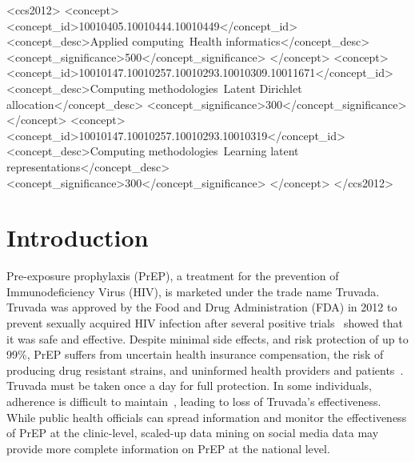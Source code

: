 \documentclass{sig-alternate-05-2015}
\begin{document}
%
%

\begin{CCSXML}
<ccs2012>
<concept>
<concept_id>10010405.10010444.10010449</concept_id>
<concept_desc>Applied computing~Health informatics</concept_desc>
<concept_significance>500</concept_significance>
</concept>
<concept>
<concept_id>10010147.10010257.10010293.10010309.10011671</concept_id>
<concept_desc>Computing methodologies~Latent Dirichlet allocation</concept_desc>
<concept_significance>300</concept_significance>
</concept>
<concept>
<concept_id>10010147.10010257.10010293.10010319</concept_id>
<concept_desc>Computing methodologies~Learning latent representations</concept_desc>
<concept_significance>300</concept_significance>
</concept>
</ccs2012>
\end{CCSXML}




%
%

%
%
\printccsdesc



\section{Introduction}
Pre-exposure prophylaxis (PrEP), a treatment for the prevention of Immunodeficiency Virus (HIV), is marketed under the trade name Truvada. Truvada was approved by the Food and Drug Administration (FDA) in 2012 to prevent sexually acquired HIV infection after several positive trials~\cite{grant2010preexposure,thigpen2012antiretroviral} showed that it was safe and effective. Despite minimal side effects, and risk protection of up to 99\%, PrEP suffers from uncertain health insurance compensation, the risk of producing drug resistant strains, and uninformed health providers and patients~\cite{liu2014early}. Truvada must be taken once a day for full protection. In some individuals, adherence is difficult to maintain~\cite{van2012unraveling}, leading to loss of Truvada's effectiveness. While public health officials can spread information and monitor the effectiveness of PrEP at the clinic-level, scaled-up data mining on social media data may provide more complete information on PrEP at the national level.
\end{document}
